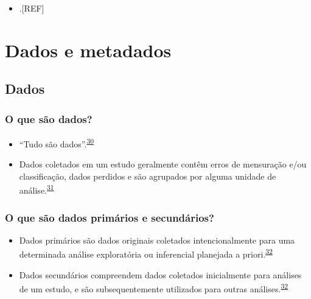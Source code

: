 \documentclass[
  a4paper,
]{book}
\providecommand{\tightlist}{%
  \setlength{\itemsep}{0pt}\setlength{\parskip}{0pt}}
\begin{document}
\begin{itemize}
\tightlist
\item
  .{[}REF{]}
\end{itemize}

\hypertarget{dados-metadados}{%
\chapter{\texorpdfstring{\textbf{Dados e metadados}}{Dados e metadados}}\label{dados-metadados}}

\hypertarget{dados}{%
\section{Dados}\label{dados}}

\hypertarget{o-que-suxe3o-dados}{%
\subsection{O que são dados?}\label{o-que-suxe3o-dados}}

\begin{itemize}
\item
  ``Tudo são dados''.\textsuperscript{\protect\hyperlink{ref-Olson2021}{30}}
\item
  Dados coletados em um estudo geralmente contêm erros de mensuração e/ou classificação, dados perdidos e são agrupados por alguma unidade de análise.\textsuperscript{\protect\hyperlink{ref-van2022a}{31}}
\end{itemize}

\hypertarget{o-que-suxe3o-dados-primuxe1rios-e-secunduxe1rios}{%
\subsection{O que são dados primários e secundários?}\label{o-que-suxe3o-dados-primuxe1rios-e-secunduxe1rios}}

\begin{itemize}
\item
  Dados primários são dados originais coletados intencionalmente para uma determinada análise exploratória ou inferencial planejada a priori.\textsuperscript{\protect\hyperlink{ref-vetter2017}{32}}
\item
  Dados secundários compreendem dados coletados inicialmente para análises de um estudo, e são subsequentemente utilizados para outras análises.\textsuperscript{\protect\hyperlink{ref-vetter2017}{32}}
\end{itemize}
\end{document}
